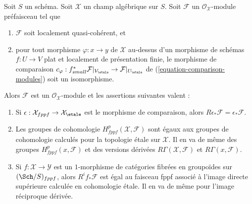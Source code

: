 \begin{lemma}
\label{lemma-compare-fppf-etale}
Soit $S$ un schéma. Soit $\mathcal{X}$ un champ algébrique sur $S$.
Soit $\mathcal{F}$ un $\mathcal{O}_\mathcal{X}$-module préfaisceau tel que
\begin{enumerate}
\item[(a)] $\mathcal{F}$ soit localement quasi-cohérent, et
\item[(b)] pour tout morphisme $\varphi : x \to y$ de $\mathcal{X}$ au-dessus
d'un morphisme de schémas $f : U \to V$ plat et
localement de présentation finie, le morphisme de comparaison
$c_\varphi : f_{small}^*\mathcal{F}|_{V_\etale} \to
\mathcal{F}|_{U_\etale}$ de
(\ref{equation-comparison-modules}) soit un isomorphisme.
\end{enumerate}
Alors $\mathcal{F}$ est un $\mathcal{O}_\mathcal{X}$-module et
les assertions suivantes valent :
\begin{enumerate}
\item Si $\epsilon : \mathcal{X}_{fppf} \to \mathcal{X}_\etale$
est le morphisme de comparaison, alors
$R\epsilon_*\mathcal{F} = \epsilon_*\mathcal{F}$.
\item Les groupes de cohomologie $H^p_{fppf}(\mathcal{X}, \mathcal{F})$ sont égaux
aux groupes de cohomologie calculés pour la topologie \'etale sur $\mathcal{X}$.
Il en va de même des groupes $H^p_{fppf}(x, \mathcal{F})$ et des
versions dérivées $R\Gamma(\mathcal{X}, \mathcal{F})$ et
$R\Gamma(x, \mathcal{F})$.
\item Si $f : \mathcal{X} \to \mathcal{Y}$ est un $1$-morphisme de
catégories fibrées en groupoïdes sur $(\Sch/S)_{fppf}$, alors
$R^if_*\mathcal{F}$ est égal au faisceau fppf associé à l'image
directe supérieure calculée en cohomologie \'etale.
Il en va de même pour l'image réciproque dérivée.
\end{enumerate}
\end{lemma}

